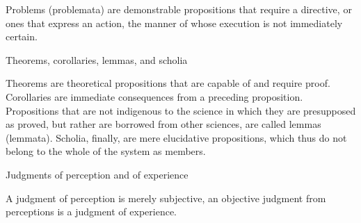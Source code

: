 Problems (problemata) are demonstrable propositions
that require a directive,
or ones that express an action,
the manner of whose execution is not immediately certain.

Theorems, corollaries, lemmas, and scholia

Theorems are theoretical propositions
that are capable of and require proof.
Corollaries are immediate consequences
from a preceding proposition.
Propositions that are not indigenous to the science
in which they are presupposed as proved,
but rather are borrowed from other sciences,
are called lemmas (lemmata).
Scholia, finally, are mere elucidative propositions,
which thus do not belong to the whole of the system as members.

Judgments of perception and of experience

A judgment of perception is merely subjective,
an objective judgment from perceptions is a judgment of experience.

